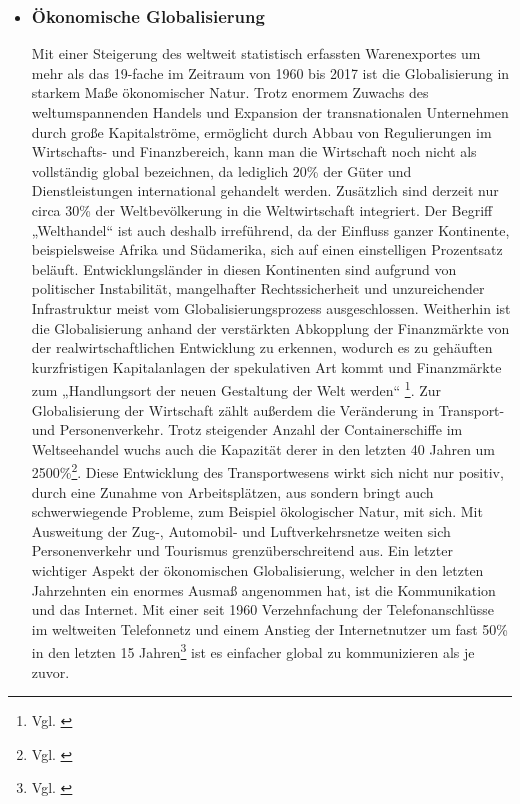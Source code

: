 \documentclass[12pt]{article}
\begin{document}
\begin{itemize}
    \item \subsubsection{Ökonomische Globalisierung}\label{sec:oekonomGlob}
    Mit einer Steigerung des weltweit statistisch erfassten Warenexportes um mehr als das 19-fache im Zeitraum von 1960 bis 2017 ist die Globalisierung in starkem Maße ökonomischer Natur. Trotz enormem Zuwachs des weltumspannenden Handels und Expansion der transnationalen Unternehmen durch große Kapitalströme, ermöglicht durch Abbau von Regulierungen im Wirtschafts- und Finanzbereich, kann man die Wirtschaft noch nicht als vollständig global bezeichnen, da lediglich 20\% der Güter und Dienstleistungen international gehandelt werden. Zusätzlich sind derzeit nur circa 30\% der Weltbevölkerung in die Weltwirtschaft integriert. Der Begriff „Welthandel“ ist auch deshalb irreführend, da der Einfluss ganzer Kontinente, beispielsweise Afrika und Südamerika, sich auf einen einstelligen Prozentsatz beläuft. Entwicklungsländer in diesen Kontinenten sind aufgrund von politischer Instabilität, mangelhafter Rechtssicherheit und unzureichender Infrastruktur meist vom Globalisierungsprozess ausgeschlossen. Weitherhin ist die Globalisierung anhand der verstärkten Abkopplung der Finanzmärkte von der realwirtschaftlichen Entwicklung zu erkennen, wodurch es zu gehäuften kurzfristigen Kapitalanlagen der spekulativen Art kommt und Finanzmärkte zum „Handlungsort der neuen Gestaltung der Welt werden“ \footnote{Vgl. \cite{Renz2001}}. Zur Globalisierung der Wirtschaft zählt außerdem die Veränderung in Transport- und Personenverkehr. Trotz steigender Anzahl der Containerschiffe im Weltseehandel wuchs auch die Kapazität derer in den letzten 40 Jahren um 2500\%\footnote{Vgl. \cite{Keller2021}}. Diese Entwicklung des Transportwesens wirkt sich nicht nur positiv, durch eine Zunahme von Arbeitsplätzen, aus sondern bringt auch schwerwiegende Probleme, zum Beispiel ökologischer Natur, mit sich. Mit Ausweitung der Zug-, Automobil- und Luftverkehrsnetze weiten sich Personenverkehr und Tourismus grenzüberschreitend aus. Ein letzter wichtiger Aspekt der ökonomischen Globalisierung, welcher in den letzten Jahrzehnten ein enormes Ausmaß angenommen hat, ist die Kommunikation und das Internet. Mit einer seit 1960 Verzehnfachung der Telefonanschlüsse im weltweiten Telefonnetz und einem Anstieg der Internetnutzer um fast 50\% in den letzten 15 Jahren\footnote{Vgl. \cite{Rabe2021}} ist es einfacher global zu kommunizieren als je zuvor.

\end{itemize}
\end{document}

